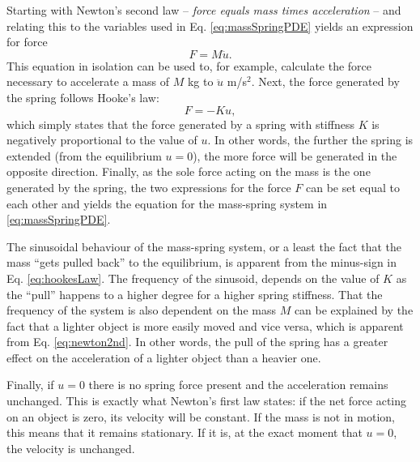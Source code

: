 Starting with Newton's second law -- \textit{force equals mass times acceleration} -- and relating this to the variables used in Eq. \eqref{eq:massSpringPDE} yields an expression for force
\begin{equation}\label{eq:newton2nd}
    F = M\ddot u.
\end{equation}
This equation in isolation can be used to, for example, calculate the force necessary to accelerate a mass of $M$ kg to $\ddot u$ m/s$^2$. Next, the force generated by the spring follows Hooke's law:
\begin{equation}\label{eq:hookesLaw}
    F = -Ku,
\end{equation} 
which simply states that the force generated by a spring with stiffness $K$ is negatively proportional to the value of $u$. In other words, the further the spring is extended (from the equilibrium $u=0$), the more force will be generated in the opposite direction. Finally, as the sole force acting on the mass is the one generated by the spring, the two expressions for the force $F$ can be set equal to each other and yields the equation for the mass-spring system in \eqref{eq:massSpringPDE}. 

The sinusoidal behaviour of the mass-spring system, or a least the fact that the mass ``gets pulled back'' to the equilibrium, is apparent from the minus-sign in Eq. \eqref{eq:hookesLaw}. The frequency of the sinusoid, depends on the value of $K$ as the ``pull'' happens to a higher degree for a higher spring stiffness. 
That the frequency of the system is also dependent on the mass $M$ can be explained by the fact that a lighter object is more easily moved and vice versa, which is apparent from Eq. \eqref{eq:newton2nd}. In other words, the pull of the spring has a greater effect on the acceleration of a lighter object than a heavier one. 



Finally, if $u = 0$ there is no spring force present and the acceleration remains unchanged. This is exactly what Newton's first law states: if the net force acting on an object is zero, its velocity will be constant. If the mass is not in motion, this means that it remains stationary. If it is, at the exact moment that $u=0$, the velocity is unchanged.

